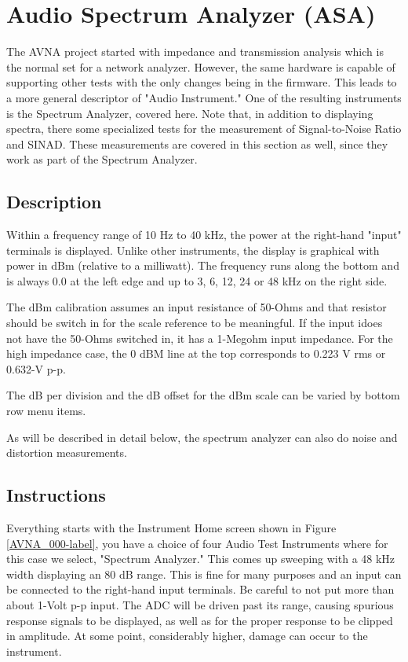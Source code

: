 \section{Audio Spectrum Analyzer (ASA)}
The AVNA project started with impedance and transmission analysis which is the normal set for a network analyzer.  However, the same hardware is capable of supporting other tests with the only changes being in the firmware.  This leads to a more general descriptor of "Audio Instrument."  One of the resulting instruments is the Spectrum Analyzer, covered here.  Note that, in addition to displaying spectra,  there some specialized tests for the measurement of Signal-to-Noise Ratio and SINAD.  These measurements are covered in this section as well, since they work as part of the Spectrum Analyzer.
\subsection{Description}
Within a frequency range of 10 Hz to 40 kHz, the power at the right-hand "input" terminals is displayed.  Unlike other instruments, the display is graphical with power in dBm (relative to a milliwatt).  The frequency runs along the bottom and is always 0.0 at the left edge and up to 3, 6, 12, 24 or 48 kHz on the right side. 

The dBm calibration assumes an input resistance of 50-Ohms and that resistor should be switch in for the scale reference to be meaningful.  If the input idoes not have the 50-Ohms switched in, it has a 1-Megohm input impedance.  For the high impedance case, the 0 dBM line at the top corresponds to 0.223 V rms or 0.632-V p-p.

The dB per division and the dB offset for the dBm scale can be varied by bottom row menu items.

As will be described in detail below, the spectrum analyzer can also do noise and  distortion measurements.

\subsection{Instructions}
Everything starts with the Instrument Home screen shown in  Figure \ref{AVNA_000-label},  you have a choice of four Audio Test Instruments where for this case we select, "Spectrum Analyzer."  This comes up sweeping with a 48 kHz width displaying an 80 dB range.   This is fine for many purposes and an input can be connected to the right-hand input terminals.  Be careful to not put more than about 1-Volt p-p input.  The ADC will be driven past its range, causing spurious response signals to be displayed, as well as for the proper response to be clipped in amplitude.  At some point, considerably higher, damage can occur to the instrument.

